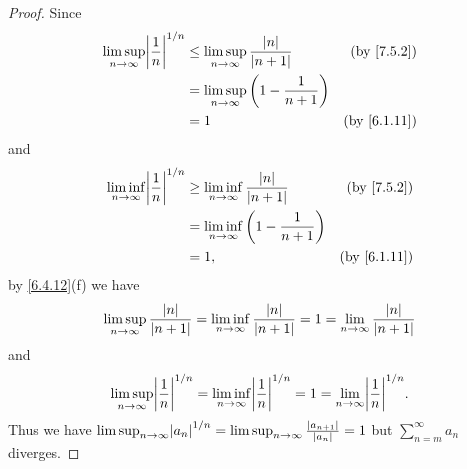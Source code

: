 \begin{proof}
  Since
  \begin{align*}
    \limsup_{n \to \infty} \abs{\frac{1}{n}}^{1 / n} & \leq \limsup_{n \to \infty} \frac{\abs{n}}{\abs{n + 1}}  & \text{(by \cref{7.5.2})}  \\
                                                     & = \limsup_{n \to \infty} \bigg(1 - \frac{1}{n + 1}\bigg)                             \\
                                                     & = 1                                                      & \text{(by \cref{6.1.11})}
  \end{align*}
  and
  \begin{align*}
    \liminf_{n \to \infty} \abs{\frac{1}{n}}^{1 / n} & \geq \liminf_{n \to \infty} \frac{\abs{n}}{\abs{n + 1}}  & \text{(by \cref{7.5.2})}  \\
                                                     & = \liminf_{n \to \infty} \bigg(1 - \frac{1}{n + 1}\bigg)                             \\
                                                     & = 1,                                                     & \text{(by \cref{6.1.11})}
  \end{align*}
  by \cref{6.4.12}(f) we have
  \[
    \limsup_{n \to \infty} \frac{\left\lvert n\right\rvert}{\left\lvert n + 1\right\rvert} = \liminf_{n \to \infty} \frac{\left\lvert n\right\rvert}{\left\lvert n + 1\right\rvert} = 1 = \lim_{n \to \infty} \frac{\left\lvert n\right\rvert}{\left\lvert n + 1\right\rvert}
  \]
  and
  \[
    \limsup_{n \to \infty} \abs{\frac{1}{n}}^{1 / n} = \liminf_{n \to \infty} \abs{\frac{1}{n}}^{1 / n} = 1 = \lim_{n \to \infty} \abs{\frac{1}{n}}^{1 / n}.
  \]
  Thus we have \(\limsup_{n \to \infty} \abs{a_n}^{1 / n} = \limsup_{n \to \infty} \frac{\abs{a_{n + 1}}}{\abs{a_n}} = 1\) but \(\sum_{n = m}^\infty a_n\) diverges.


\end{proof}
